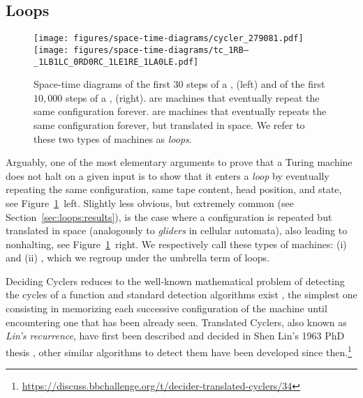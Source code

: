 \newpage
\subsection{Loops}\label{sec:loops}


\begin{figure}[h!]
    \centering
    \texttt{[image: figures/space-time-diagrams/cycler\_279081.pdf]}
    \hspace{10ex}
    \texttt{[image: figures/space-time-diagrams/tc\_1RB---\_1LB1LC\_0RD0RC\_1LE1RE\_1LA0LE.pdf]}
    \caption{Space-time diagrams of the first 30 steps of a \textit{\cycler},  (left) and of the first $10{,}000$ steps of a \textit{\TC},  (right). \cyclers are machines that eventually repeat the same configuration forever. \TCs are machines that eventually repeats the same configuration forever, but translated in space. We refer to these two types of machines as \textit{loops}.}\label{fig:loops}
\end{figure}

Arguably, one of the most elementary arguments to prove that a Turing machine does not halt on a given input is to show that it enters a \textit{loop} by eventually repeating the same configuration, \ie same tape content, head position, and state, see Figure~\ref{fig:loops}~left. Slightly less obvious, but extremely common (see Section~\ref{sec:loops:results}), is the case where a configuration is repeated but translated in space (analogously to \textit{gliders} in cellular automata), also leading to nonhalting, see Figure~\ref{fig:loops}~right. We respectively call these types of machines: (i) \textit{\cyclers} and (ii) \textit{\TCs}, which we regroup under the umbrella term of loops.

Deciding Cyclers reduces to the well-known mathematical problem of detecting the cycles of a function and standard detection algorithms exist \cite{wiki:Cycle_detection}, the simplest one consisting in memorizing each successive configuration of the machine until encountering one that has been already seen. Translated Cyclers, also known as \textit{Lin's recurrence}, have first been described and decided in Shen Lin's 1963 PhD thesis \cite{Lin1963}, other similar algorithms to detect them have been developed since then.\footnote{\url{https://discuss.bbchallenge.org/t/decider-translated-cyclers/34}}


